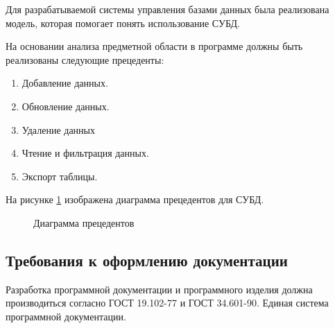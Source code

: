 Для разрабатываемой системы управления базами данных была реализована модель, которая помогает понять использование СУБД.

На основании анализа предметной области в программе должны быть реализованы следующие прецеденты:
\begin{enumerate}
\item Добавление данных.
\item Обновление данных.
\item Удаление данных
\item Чтение и фильтрация данных.
\item Экспорт таблицы.
\end{enumerate}

На рисунке \ref{prec:image} изображена диаграмма прецедентов для СУБД.

\begin{figure}[ht]
	\caption{Диаграмма прецедентов}
	\label{prec:image}
\end{figure}

\subsection{Требования к оформлению документации}

Разработка программной документации и программного изделия должна производиться согласно ГОСТ 19.102-77 и ГОСТ 34.601-90. Единая система программной документации.
